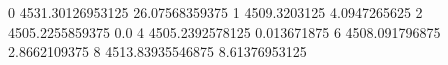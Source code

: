0 4531.30126953125 26.07568359375
1 4509.3203125 4.0947265625
2 4505.2255859375 0.0
4 4505.2392578125 0.013671875
6 4508.091796875 2.8662109375
8 4513.83935546875 8.61376953125
